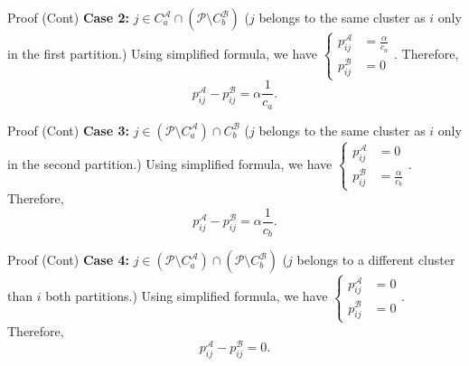 \begin{frame}
    
    \begin{block}{Proof (Cont)}
  \textbf{Case 2:} $j \in C_a^\mathcal{A} \cap (\mathcal{P} \setminus C_b^{\mathcal{B}})$ ($j$ belongs to the same cluster as $i$ only in the first partition.)
%
 Using simplified formula, we have $\displaystyle
  \begin{cases}
      p_{ij}^\mathcal{A} &= \frac{\alpha}{c_a} \\
      p_{ij}^\mathcal{B} &= 0
  \end{cases}$. Therefore, 
  \[ p_{ij}^\mathcal{A} - p_{ij}^\mathcal{B} = \alpha \frac{1}{c_a} .\]
  \end{block}
    \hyperlink{optslide}{}
  \end{frame}
  
\begin{frame}
  \begin{block}{Proof (Cont)}
%
  \textbf{Case 3:} $j \in (\mathcal{P} \setminus C_a^\mathcal{A}) \cap  C_b^{\mathcal{B}}$ ($j$ belongs to the same cluster as $i$ only in the second partition.)
%
 Using simplified formula, we have $\displaystyle
  \begin{cases}
      p_{ij}^\mathcal{A} &= 0 \\
      p_{ij}^\mathcal{B} &=\frac{\alpha}{c_b}
  \end{cases}$. Therefore, 
  \[ p_{ij}^\mathcal{A} - p_{ij}^\mathcal{B} = \alpha \frac{1}{c_b} .\]
  \end{block}
    \hyperlink{optslide}{}
\end{frame}
  
  
\begin{frame}
  \begin{block}{Proof (Cont)}
%
%
  \textbf{Case 4:} $j \in (\mathcal{P} \setminus C_a^\mathcal{A}) \cap  (\mathcal{P} \setminus C_b^{\mathcal{B}})$ ($j$ belongs to a different cluster than $i$ both partitions.)
%
 Using simplified formula, we have $\displaystyle
  \begin{cases}
      p_{ij}^\mathcal{A} &= 0 \\
      p_{ij}^\mathcal{B} &=0
  \end{cases}$. Therefore, 
  \[ p_{ij}^\mathcal{A} - p_{ij}^\mathcal{B} = 0 .\]
  \end{block}
  
    \hyperlink{optslide}{}
  \end{frame}
%
%

